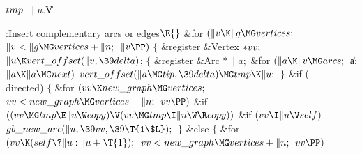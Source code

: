 \Y\B\4\D$\\{tmp}$ \5
$\|u.{}$\|V%
\par
\Y\B\4:Insert complementary arcs or edges\X${}\E{}$\6
\&{for} ${}(\|v\K\|g\MG\\{vertices};{}$ ${}\|v<\|g\MG\\{vertices}+\|n;{}$ ${}%
\|v\PP){}$\5
${}\{{}$\5
\1\&{register} \&{Vertex} ${}{*}\\{vv};{}$\7
${}\|u\K\\{vert\_offset}(\|v,\39\\{delta}){}$;\6
${}\{{}$\5
\1\&{register} \&{Arc} ${}{*}\|a;{}$\7
\&{for} ${}(\|a\K\|v\MG\\{arcs};{}$ \|a; ${}\|a\K\|a\MG\\{next}){}$\1\5
${}\\{vert\_offset}(\|a\MG\\{tip},\39\\{delta})\MG\\{tmp}\K\|u;{}$\2\6
\4${}\}{}$\2\6
\&{if} (\\{directed})\5
${}\{{}$\1\6
\&{for} ${}(\\{vv}\K\\{new\_graph}\MG\\{vertices};{}$ ${}\\{vv}<\\{new\_graph}%
\MG\\{vertices}+\|n;{}$ ${}\\{vv}\PP){}$\1\6
\&{if} ${}((\\{vv}\MG\\{tmp}\E\|u\W\\{copy})\V(\\{vv}\MG\\{tmp}\I\|u\W\R%
\\{copy})){}$\1\6
\&{if} ${}(\\{vv}\I\|u\V\\{self}){}$\1\5
${}\\{gb\_new\_arc}(\|u,\39\\{vv},\39\T{1\$L});{}$\2\2\2\6
\4${}\}{}$\5
\2\&{else}\5
${}\{{}$\1\6
\&{for} ${}(\\{vv}\K(\\{self}\?\|u:\|u+\T{1});{}$ ${}\\{vv}<\\{new\_graph}\MG%
\\{vertices}+\|n;{}$ ${}\\{vv}\PP){}$\1\6
